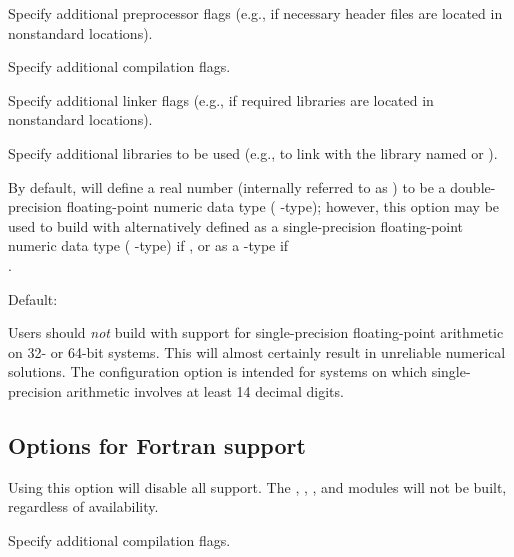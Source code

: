 \begin{config}
\item {}

  Specify additional {\C} preprocessor flags 
  (e.g.,  if necessary header files are located in
   nonstandard locations).

\item {}

  Specify additional {\C} compilation flags.

\item {}

  Specify additional linker flags (e.g.,  if
  required libraries are located in nonstandard locations).

\item {}

  Specify additional libraries to be used (e.g.,  to
  link with the library named  or ).

\item {}

  By default, {\sundials} will define a real number (internally referred to as
  ) to be a double-precision floating-point numeric data type
  ( {\C}-type); however, this option may be used to build {\sundials}
  with  alternatively defined as a single-precision floating-point
  numeric data type ( {\C}-type) if , or as a
   {\C}-type if \\ .

  Default: 

  {\warn}Users should {\em not} build {\sundials} with support for
  single-precision floating-point arithmetic on 32- or 64-bit systems.
  This will almost certainly result in unreliable numerical solutions.
  The configuration option  is intended for
  systems on which single-precision arithmetic involves at least 14 decimal
  digits.

\end{config}


\subsection*{Options for Fortran support}

\begin{config}

\item {}

  Using this option will disable all {\F} support. The {\fcvode},
 {\fkinsol}, {\fida}, and {\fnvector} modules will not be built,
 regardless of availability.

\item {}

  Specify additional {\F} compilation flags.

\end{config}


